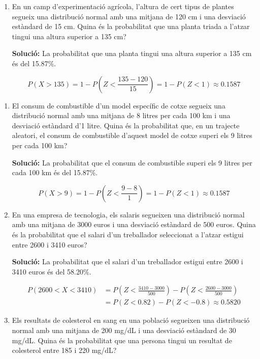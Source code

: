 \documentclass[12pt]{article}
\begin{document}
\begin{exemple} [title=]
\begin{enumerate} [start=10]
    \item En un camp d'experimentació agrícola, l'altura de cert tipus de plantes segueix una distribució normal amb una mitjana de 120 cm i una desviació estàndard de 15 cm. Quina és la probabilitat que una planta triada a l'atzar tingui una altura superior a 135 cm?
    
    \textbf{Solució:} La probabilitat que una planta tingui una altura superior a 135 cm és del 15.87\%.
    
    \[
    P(X > 135) = 1 - P\left(Z< \frac{135 - 120}{15} \right) = 1 - P(Z< 1) \approx 0.1587
    \]
\end{enumerate}
    
\end{exemple}

\begin{exemple} [title=]

\begin{enumerate} [start=15]

    \item El consum de combustible d'un model específic de cotxe segueix una distribució normal amb una mitjana de 8 litres per cada 100 km i una desviació estàndard d'1 litre. Quina és la probabilitat que, en un trajecte aleatori, el consum de combustible d'aquest model de cotxe superi els 9 litres per cada 100 km?
    
    \textbf{Solució:} La probabilitat que el consum de combustible superi els 9 litres per cada 100 km és del 15.87\%.
    
    \[
    P(X > 9) = 1 - P\left(Z< \frac{9 - 8}{1} \right) = 1 - P(Z< 1) \approx 0.1587
    \]

    \item En una empresa de tecnologia, els salaris segueixen una distribució normal amb una mitjana de 3000 euros i una desviació estàndard de 500 euros. Quina és la probabilitat que el salari d'un treballador seleccionat a l'atzar estigui entre 2600 i 3410 euros?
    
    \textbf{Solució:} La probabilitat que el salari d'un treballador estigui entre 2600 i 3410 euros és del 58.20\%.
    
    \begin{align*}
    P(2600 < X < 3410) &= P\left(Z< \frac{3410 - 3000}{500} \right) - P\left(Z< \frac{2600 - 3000}{500} \right) \\
    &= P(Z< 0.82) - P(Z< -0.8) \approx 0.5820
    \end{align*}

    \item Els resultats de colesterol en sang en una població segueixen una distribució normal amb una mitjana de 200 mg/dL i una desviació estàndard de 30 mg/dL. Quina és la probabilitat que una persona tingui un resultat de colesterol entre 185 i 220 mg/dL?
    

\end{enumerate}
\end{exemple}
\end{document}
